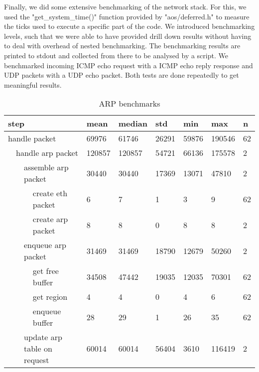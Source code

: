 Finally, we did some extensive benchmarking of the network stack. For this, we used the "get\_system\_time()" function provided by "aos/deferred.h" to measure the ticks used to execute a specific part of the code. We introduced benchmarking levels, such that we were able to have provided drill down results without having to deal with overhead of nested benchmarking.
The benchmarking results are printed to stdout and collected from there to be analysed by a script.
We benchmarked incoming ICMP echo request with a ICMP echo reply response and UDP packets with a UDP echo packet. Both tests are done repeatedly to get meaningful results.

\begin{table}[]
    \begin{tabular}{|llll|l|l|l|l|l|l|}
    \hline
    \multicolumn{4}{|l|}{step} & mean & median & std & min & max & n \\ \hline
    \multicolumn{4}{|l|}{handle packet} & 69976 & 61746 & 26291 & 59876 & 190546 & 62 \\
    \multicolumn{1}{|l|}{} & \multicolumn{3}{l|}{handle arp packet} & 120857 & 120857 & 54721 & 66136 & 175578 & 2 \\
    \multicolumn{1}{|l|}{} & \multicolumn{1}{l|}{} & \multicolumn{2}{l|}{assemble arp packet} & 30440 & 30440 & 17369 & 13071 & 47810 & 2 \\
    \multicolumn{1}{|l|}{} & \multicolumn{1}{l|}{} & \multicolumn{1}{l|}{} & create eth packet & 6 & 7 & 1 & 3 & 9 & 62 \\
    \multicolumn{1}{|l|}{} & \multicolumn{1}{l|}{} & \multicolumn{1}{l|}{} & create arp packet & 8 & 8 & 0 & 8 & 8 & 2 \\
    \multicolumn{1}{|l|}{} & \multicolumn{1}{l|}{} & \multicolumn{2}{l|}{enqueue arp packet} & 31469 & 31469 & 18790 & 12679 & 50260 & 2 \\
    \multicolumn{1}{|l|}{} & \multicolumn{1}{l|}{} & \multicolumn{1}{l|}{} & get free buffer & 34508 & 47442 & 19035 & 12035 & 70301 & 62 \\
    \multicolumn{1}{|l|}{} & \multicolumn{1}{l|}{} & \multicolumn{1}{l|}{} & get region & 4 & 4 & 0 & 4 & 6 & 62 \\
    \multicolumn{1}{|l|}{} & \multicolumn{1}{l|}{} & \multicolumn{1}{l|}{} & enqueue buffer & 28 & 29 & 1 & 26 & 35 & 62 \\
    \multicolumn{1}{|l|}{} & \multicolumn{1}{l|}{} & \multicolumn{2}{l|}{update arp table on request} & 60014 & 60014 & 56404 & 3610 & 116419 & 2 \\
    \hline
    \end{tabular}
    \caption{ARP benchmarks}
    \label{tab:arp-benchmarks}
\end{table}

